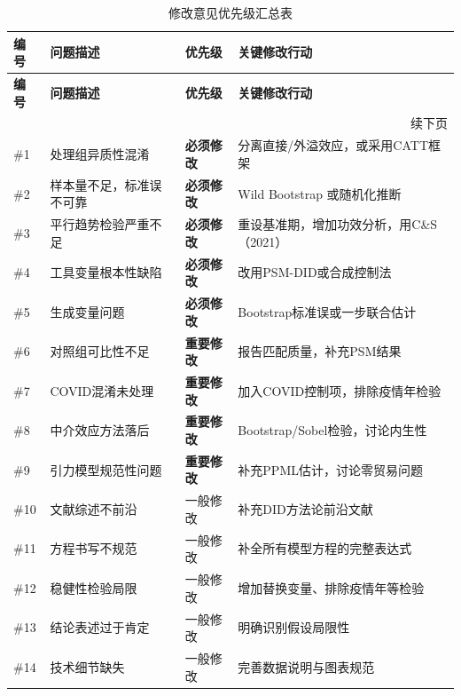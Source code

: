 \documentclass[12pt, a4paper]{article}
\begin{document}
\begin{longtable}{|p{0.5cm}|p{5.5cm}|p{2.5cm}|p{3.5cm}|}
\caption{修改意见优先级汇总表} \label{tab:revision_matrix} \\
\hline
\textbf{编号} & \textbf{问题描述} & \textbf{优先级} & \textbf{关键修改行动} \\
\hline
\endfirsthead
\hline
\textbf{编号} & \textbf{问题描述} & \textbf{优先级} & \textbf{关键修改行动} \\
\hline
\endhead
\hline \multicolumn{4}{r}{\small 续下页} \\
\endfoot
\hline
\endlastfoot

\#1 & 处理组异质性混淆 & \textcolor{criticalred}{\textbf{必须修改}} & 分离直接/外溢效应，或采用CATT框架 \\
\hline
\#2 & 样本量不足，标准误不可靠 & \textcolor{criticalred}{\textbf{必须修改}} & Wild Bootstrap 或随机化推断 \\
\hline
\#3 & 平行趋势检验严重不足 & \textcolor{criticalred}{\textbf{必须修改}} & 重设基准期，增加功效分析，用C\&S（2021） \\
\hline
\#4 & 工具变量根本性缺陷 & \textcolor{criticalred}{\textbf{必须修改}} & 改用PSM-DID或合成控制法 \\
\hline
\#5 & 生成变量问题 & \textcolor{criticalred}{\textbf{必须修改}} & Bootstrap标准误或一步联合估计 \\
\hline
\#6 & 对照组可比性不足 & \textcolor{majororange}{\textbf{重要修改}} & 报告匹配质量，补充PSM结果 \\
\hline
\#7 & COVID混淆未处理 & \textcolor{majororange}{\textbf{重要修改}} & 加入COVID控制项，排除疫情年检验 \\
\hline
\#8 & 中介效应方法落后 & \textcolor{majororange}{\textbf{重要修改}} & Bootstrap/Sobel检验，讨论内生性 \\
\hline
\#9 & 引力模型规范性问题 & \textcolor{majororange}{\textbf{重要修改}} & 补充PPML估计，讨论零贸易问题 \\
\hline
\#10 & 文献综述不前沿 & \textcolor{minorolive}{一般修改} & 补充DID方法论前沿文献 \\
\hline
\#11 & 方程书写不规范 & \textcolor{minorolive}{一般修改} & 补全所有模型方程的完整表达式 \\
\hline
\#12 & 稳健性检验局限 & \textcolor{minorolive}{一般修改} & 增加替换变量、排除疫情年等检验 \\
\hline
\#13 & 结论表述过于肯定 & \textcolor{minorolive}{一般修改} & 明确识别假设局限性 \\
\hline
\#14 & 技术细节缺失 & \textcolor{minorolive}{一般修改} & 完善数据说明与图表规范 \\
\hline
\end{longtable}
\end{document}
